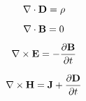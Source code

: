 \documentclass{article}
\begin{document}
\begin{equation}
\nabla\cdot{\bf D} = \rho 
\end{equation}

\begin{equation}
\nabla\cdot{\bf B} = 0 
\end{equation}

\begin{equation}
\nabla\times{\bf E} = - {{\partial{\bf B}}\over{\partial t}} 
\end{equation}

\begin{equation}
\nabla\times{\bf H} = {\bf J} + {{\partial{\bf D}}\over{\partial t}} 
\end{equation}
\end{document}
